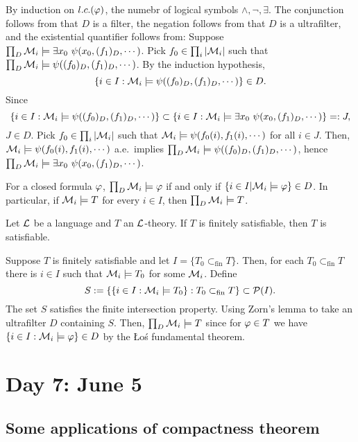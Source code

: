 \documentclass{../../small}
\begin{document}
\begin{pf}
By induction on $l.c.(\varphi)$, the numebr of logical symbols $\wedge,\neg,\exists$.
The conjunction follows from that $D$ is a filter, the negation follows from that $D$ is a ultrafilter, and the existential quantifier follows from:
Suppose $\prod_D\cM_i\models\exists x_0\ \psi(x_0,(f_1)_D,\cdots)$.
Pick $f_0\in\prod_i|\mathcal{M}_i|$ such that $\prod_D\mathcal{M}_i\models\psi((f_0)_D,(f_1)_D,\cdots)$.
By the induction hypothesis,
\[\{i\in I:\mathcal{M}_i\models\psi((f_0)_D,(f_1)_D,\cdots)\}\in D.\]
Since
\[\{i\in I:\mathcal{M}_i\models\psi((f_0)_D,(f_1)_D,\cdots)\}\subset\{i\in I:\mathcal{M}_i\models\exists x_0\ \psi(x_0,(f_1)_D,\cdots)\}=:J,\]
$J\in D$.
Pick $f_0\in\prod_i|\mathcal{M}_i|$ such that $\mathcal{M}_i\models\psi(f_0(i),f_1(i),\cdots)$ for all $i\in J$.
Then, $\mathcal{M}_i\models\psi(f_0(i),f_1(i),\cdots)$ a.e.~implies $\prod_D\mathcal{M}_i\models\psi((f_0)_D,(f_1)_D,\cdots)$, hence $\prod_D\cM_i\models\exists x_0\ \psi(x_0,(f_1)_D,\cdots)$.
\end{pf}

\begin{cor*}
For a closed formula $\varphi$, $\prod_D\mathcal{M}_i\models\varphi$ if and only if $\{i\in I|\mathcal{M}_i\models\varphi\}\in D$.
In particular, if $\mathcal{M}_i\models T$ for every $i\in I$, then $\prod_D\mathcal{M}_i\models T$.
\end{cor*}


\begin{thm*}
Let $\mathcal{L}$ be a language and $T$ an $\mathcal{L}$-theory.
If $T$ is finitely satisfiable, then $T$ is satisfiable.
\end{thm*}
\begin{pf}
Suppose $T$ is finitely satisfiable and let $I=\{T_0\subset_{\mathrm{fin}}T\}$.
Then, for each $T_0\subset_{\mathrm{fin}}T$ there is $i\in I$ such that $\mathcal{M}_i\models T_0$ for some $\mathcal{M}_i$.
Define
\[S:=\{\{i\in I:\mathcal{M}_i\models T_0\}:T_0\subset_{\mathrm{fin}}T\}\subset\mathcal{P}(I).\]
The set $S$ satisfies the finite intersection property.
Using Zorn's lemma to take an ultrafilter $D$ containing $S$.
Then, $\prod_D\mathcal{M}_i\models T$ since for $\varphi\in T$ we have $\{i\in I:\mathcal{M}_i\models\varphi\}\in D$ by the \L o\'s fundamental theorem.
\end{pf}


\newpage
\section{Day 7: June 5}

\subsection*{Some applications of compactness theorem}
\end{document}
